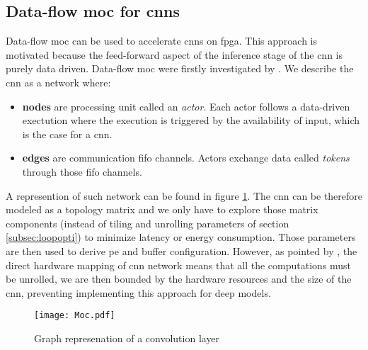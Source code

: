 \subsection{Data-flow \acrshort{moc} for \acrshort{cnn}s}
Data-flow \acrfull{moc} can be used to accelerate \acrshort{cnn}s on \acrshort{fpga}. This approach is motivated because the feed-forward aspect of the inference stage of the \acrshort{cnn} is purely data driven.
Data-flow \acrfull{moc} were firstly investigated by \cite{lin_li_low_2016}.  We describe the \acrshort{cnn} as a network where:
\begin{itemize}
    \item \textbf{nodes} are processing unit called an \textit{actor}. Each actor follows a data-driven exectution where the execution is triggered by the availability of input, which is the case for a \acrshort{cnn}.
    \item \textbf{edges} are communication \acrshort{fifo} channels. Actors exchange data called \textit{tokens} through those \acrshort{fifo} channels.
\end{itemize}
A represention of such network can be found in figure \ref{fig:moc}. \newline \newline
The \acrshort{cnn} can be therefore modeled as a topology matrix and we only have to explore those matrix components (instead of tiling and unrolling parameters of section \ref{subsec:loopopti}) to minimize latency or energy consumption. Those parameters are then used to derive \acrshort{pe} and buffer configuration. However, as pointed by \cite{abdelouahab_tactics_2017}, the direct hardware mapping of \acrshort{cnn} network means that all the computations must be unrolled, we are then bounded by the hardware resources and the size of the \acrshort{cnn}, preventing implementing this approach for deep models.
\begin{figure}
    \centering
    \texttt{[image: Moc.pdf]}
    \label{fig:moc}
    \caption{Graph represenation of a convolution layer}
\end{figure}
